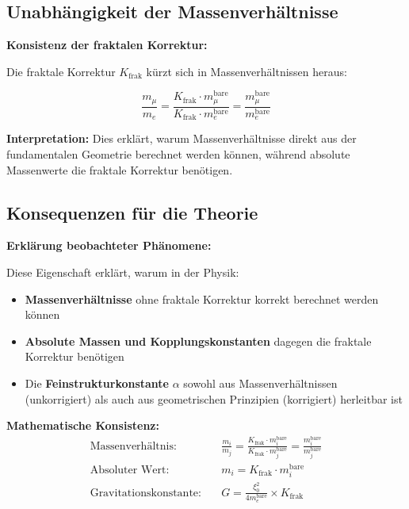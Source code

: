 	\subsection{Unabhängigkeit der Massenverhältnisse}
	
	\begin{keyresult}
		\textbf{Konsistenz der fraktalen Korrektur:}
		
		Die fraktale Korrektur $K_{\text{frak}}$ kürzt sich in Massenverhältnissen heraus:
		
		\begin{equation}
			\frac{m_\mu}{m_e} = \frac{K_{\text{frak}} \cdot m_\mu^{\text{bare}}}{K_{\text{frak}} \cdot m_e^{\text{bare}}} = \frac{m_\mu^{\text{bare}}}{m_e^{\text{bare}}}
		\end{equation}
		
		\textbf{Interpretation:} 
		Dies erklärt, warum Massenverhältnisse direkt aus der fundamentalen Geometrie berechnet werden können, während absolute Massenwerte die fraktale Korrektur benötigen.
	\end{keyresult}
	
	\subsection{Konsequenzen für die Theorie}
	
	\begin{derivation}
		\textbf{Erklärung beobachteter Phänomene:}
		
		Diese Eigenschaft erklärt, warum in der Physik:
		
		\begin{itemize}
			\item \textbf{Massenverhältnisse} ohne fraktale Korrektur korrekt berechnet werden können
			\item \textbf{Absolute Massen und Kopplungskonstanten} dagegen die fraktale Korrektur benötigen
			\item Die \textbf{Feinstrukturkonstante} $\alpha$ sowohl aus Massenverhältnissen (unkorrigiert) als auch aus geometrischen Prinzipien (korrigiert) herleitbar ist
		\end{itemize}
		
		\textbf{Mathematische Konsistenz:}
		\begin{align}
			\text{Massenverhältnis:} &\quad \frac{m_i}{m_j} = \frac{K_{\text{frak}} \cdot m_i^{\text{bare}}}{K_{\text{frak}} \cdot m_j^{\text{bare}}} = \frac{m_i^{\text{bare}}}{m_j^{\text{bare}}} \\
			\text{Absoluter Wert:} &\quad m_i = K_{\text{frak}} \cdot m_i^{\text{bare}} \\
			\text{Gravitationskonstante:} &\quad G = \frac{\xi_0^2}{4 m_e^{\text{bare}}} \times K_{\text{frak}}
		\end{align}
	\end{derivation}
	
